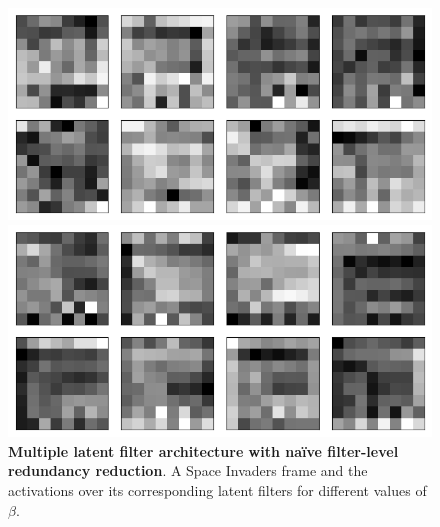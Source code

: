 \begin{figure}[h!]
\begin{minipage}{0.55\textwidth}
\caption{$\beta = 1$}
\includegraphics[scale=0.42]{figures/results/naive_average/beta_4_convolutional_layers_sample_3.png}
\caption{$\beta = 4$}
\includegraphics[scale=0.42]{figures/results/naive_average/beta_32_convolutional_layers_sample_3.png}
\caption{$\beta = 32$}
\end{minipage}
\caption{\textbf{Multiple latent filter architecture with na{\"i}ve filter-level redundancy reduction}. A Space Invaders frame and the activations over its corresponding latent filters for different values of $\beta$.}
\label{fig:naive_average_originals_and_latent_filters}
\end{figure}



